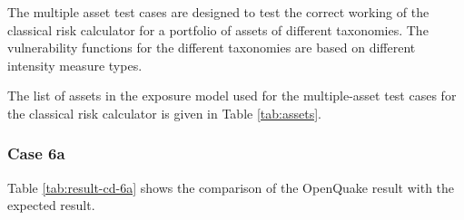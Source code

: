 The multiple asset test cases are designed to test the correct working of the classical risk calculator for a portfolio of assets of different taxonomies. The vulnerability functions for the different taxonomies are based on different intensity measure types.

The list of assets in the exposure model used for the multiple-asset test cases for the classical risk calculator is given in Table \ref{tab:assets}.

\subsubsection{Case 6a}




Table \ref{tab:result-cd-6a} shows the comparison of the OpenQuake result with the expected result.